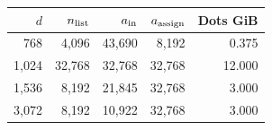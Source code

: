 \begin{tabular}{@{}rrrrr@{}}
\toprule
$d$ & $n_{\rm list}$ & $a_{\rm in}$ & $a_{\rm assign}$ & Dots GiB \\
\midrule
768 & 4,096 & 43,690 & 8,192 & 0.375 \\
1,024 & 32,768 & 32,768 & 32,768 & 12.000 \\
1,536 & 8,192 & 21,845 & 32,768 & 3.000 \\
3,072 & 8,192 & 10,922 & 32,768 & 3.000 \\
\bottomrule
\end{tabular}

